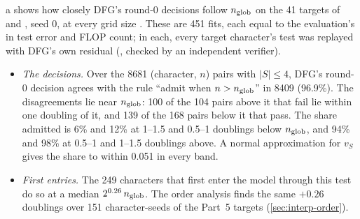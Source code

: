a shows how closely DFG's round-0 decisions follow $n_{\rm glob}$ on the 41 targets of  and , seed 0, at every grid size . These are 451 fits, each equal to the evaluation's in test error and FLOP count; in each, every target character's test was replayed with DFG's own residual (, checked by an independent verifier).
\begin{itemize}
\item \emph{The decisions.} Over the 8681 (character, $n$) pairs with $|S|\le4$, DFG's round-0 decision agrees with the rule ``admit when $n>n_{\rm glob}$'' in 8409 (96.9\%). The disagreements lie near $n_{\rm glob}$: 100 of the 104 pairs above it that fail lie within one doubling of it, and 139 of the 168 pairs below it that pass. The share admitted is 6\% and 12\% at 1--1.5 and 0.5--1 doublings below $n_{\rm glob}$, and 94\% and 98\% at 0.5--1 and 1--1.5 doublings above. A normal approximation for $v_S$ gives the share to within 0.051 in every band.
\item \emph{First entries.} The 249 characters that first enter the model through this test do so at a median $2^{0.26}\,n_{\rm glob}$. The order analysis finds the same $+0.26$ doublings over 151 character-seeds of the Part~5 targets (\cref{sec:interp-order}).
\end{itemize}

